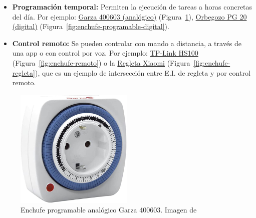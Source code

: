 \documentclass[a4paper,10pt]{article}
\begin{document}
\begin{itemize}
\item
  \textbf{Programación temporal:} Permiten la ejecución de tareas a horas
  concretas del día. Por ejemplo:
  \href{https://web.archive.org/web/20191111121153/https://www.amazon.es/Garza-Power-Temporizador-anal\%C3\%B3gico-programaci\%C3\%B3n/dp/B00URUVDW2/}{Garza
  400603 (analógico)} (Figura~\ref{fig:enchufe-programable-analogico}),
  \href{https://web.archive.org/web/20191112121450/https://www.amazon.es/dp/B00ZJ1LQDK}{Orbegozo
    PG 20 (digital)} (Figura~\ref{fig:enchufe-programable-digital}).
\item
  \textbf{Control remoto:} Se pueden controlar con mando a distancia, a través de
  una app o con control por voz. Por ejemplo:
  \href{https://web.archive.org/web/20191112130933/https://www.amazon.es/dp/B06W586CDZ}{TP-Link
  HS100} (Figura~\ref{fig:enchufe-remoto}) o la
  \href{https://web.archive.org/web/20191116174434/https://www.amazon.es/dp/B07DJ2G1CW}{Regleta
  Xiaomi} (Figura~\ref{fig:enchufe-regleta}), que es un ejemplo
  de intersección entre E.I. de regleta y por control remoto.
\end{itemize}

\begin{figure}[H]
  \centering
  \includegraphics[width=0.5\textwidth]{img/enchufe_programable_analogico.jpg}
  \caption{Enchufe programable analógico Garza 400603. Imagen de~\cite{amazonwebsiteGarza400603Temporizador}}\label{fig:enchufe-programable-analogico}
\end{figure}
\end{document}
